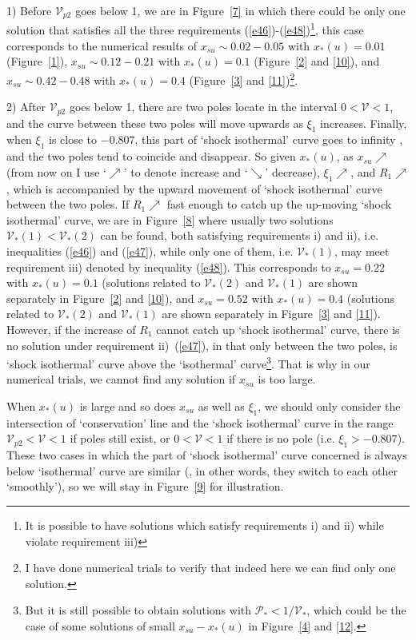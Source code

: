 \documentclass[fleqn,usenatbib]{mnras}
\begin{document}
1) Before $\mathcal{V}_{p2}$ goes below 1, we are in Figure~\ref{7} in which there could be only one solution that satisfies all the three requirements (\ref{e46})-(\ref{e48})\footnote{It is possible to have solutions which satisfy requirements i) and ii) while violate requirement iii)}, this case corresponds to the numerical results of $x_{su}\sim 0.02-0.05$ with $x_{*}(u)=0.01$ (Figure~\ref{1}), $x_{su}\sim 0.12-0.21$ with $x_{*}(u)=0.1$ (Figure~\ref{2} and \ref{10}), and $x_{su}\sim 0.42-0.48$ with $x_{*}(u)=0.4$ (Figure~\ref{3} and \ref{11})\footnote{I have done numerical trials to verify that indeed here we can find only one solution.}. 

2) After $\mathcal{V}_{p2}$ goes below 1, there are two poles locate in the interval $0<\mathcal{V}<1$, and the curve between these two poles will move upwards as $\xi_{1}$ increases. Finally, when $\xi_{1}$ is close to $-0.807$, this part of `shock isothermal' curve goes to infinity , and the two poles tend to coincide and disappear. So given $x_{*}(u)$, as $x_{su}\nearrow$ (from now on I use `$\nearrow$' to denote increase and `$\searrow$' decrease), $\xi_{1}\nearrow$, and $R_{1}\nearrow$, which is accompanied by the upward movement of `shock isothermal' curve between the two poles. If $R_{1}\nearrow$ fast enough to catch up the up-moving `shock isothermal' curve, we are in Figure~\ref{8} where usually two solutions $\mathcal{V}_{*}(1)<\mathcal{V}_{*}(2)$ can be found, both satisfying requirements i) and ii), i.e. inequalities (\ref{e46}) and (\ref{e47}), while only one of them, i.e. $\mathcal{V}_{*}(1)$, may meet requirement iii) denoted by inequality (\ref{e48}). This corresponds to $x_{su}=0.22$ with $x_{*}(u)=0.1$ (solutions related to $\mathcal{V}_{*}(2)$ and $\mathcal{V}_{*}(1)$ are shown separately in Figure~\ref{2} and \ref{10}), and $x_{su}=0.52$ with $x_{*}(u)=0.4$ (solutions related to $\mathcal{V}_{*}(2)$ and $\mathcal{V}_{*}(1)$ are shown separately in Figure~\ref{3} and \ref{11}). However, if the increase of $R_{1}$ cannot catch up `shock isothermal' curve, there is no solution under requirement ii)~(\ref{e47}), in that only between the two poles, is `shock isothermal' curve above the `isothermal' curve\footnote{But it is still possible to obtain solutions with $\mathcal{P}_{*}<1/\mathcal{V}_{*}$, which could be the case of some solutions of small $x_{su}-x_{*}(u)$ in Figure~\ref{4} and \ref{12}.}. That is why in our numerical trials, we cannot find any solution if $x_{su}$ is too large.

When $x_{*}(u)$ is large and so does $x_{su}$ as well as $\xi_{1}$, we should only consider the intersection of `conservation' line and the `shock isothermal' curve in the range $\mathcal{V}_{p2}<\mathcal{V}<1$ if poles still exist, or $0<\mathcal{V}<1$ if there is no pole (i.e. $\xi_{1}>-0.807$). These two cases in which the part of `shock isothermal' curve concerned is always below `isothermal' curve are similar (, in other words, they switch to each other `smoothly'), so we will stay in Figure~\ref{9} for illustration. 
\end{document}
